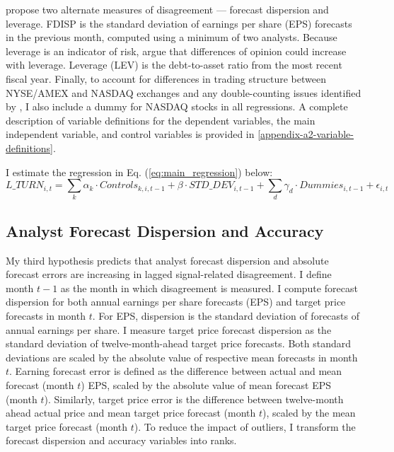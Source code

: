 \documentclass[
  12pt,
  a4paper,
  twoside,
  onecolumn]{article}
\begin{document}
 propose two alternate measures of
disagreement --- forecast dispersion and leverage. FDISP is the standard
deviation of earnings per share (EPS) forecasts in the previous month,
computed using a minimum of two analysts. Because leverage is an
indicator of risk,  argue that differences
of opinion could increase with leverage. Leverage (LEV) is the
debt-to-asset ratio from the most recent fiscal year. Finally, to
account for differences in trading structure between NYSE/AMEX and
NASDAQ exchanges and any double-counting issues identified by
\cite{nasdaq_double_counting}, I also include a dummy for NASDAQ stocks
in all regressions. A complete description of variable definitions for
the dependent variables, the main independent variable, and control
variables is provided in \ref{appendix-a2-variable-definitions}.

I estimate the regression in Eq. (\ref{eq:main_regression}) below:
\begin{equation}
\label{eq:main_regression}
L\_TURN_{i,t} = \sum_k \alpha_k \cdot Controls_{k,i,t-1} + \beta \cdot STD\_DEV_{i,t-1} + \sum_d \gamma_d \cdot Dummies_{i,t-1} + \epsilon_{i,t}
\end{equation}

\hypertarget{analyst-forecast-dispersion-and-accuracy}{%
\subsection{Analyst Forecast Dispersion and
Accuracy}\label{analyst-forecast-dispersion-and-accuracy}}

My third hypothesis predicts that analyst forecast dispersion and
absolute forecast errors are increasing in lagged signal-related
disagreement. I define month \(t-1\) as the month in which disagreement
is measured. I compute forecast dispersion for both annual earnings per
share forecasts (EPS) and target price forecasts in month \(t\). For
EPS, dispersion is the standard deviation of forecasts of annual
earnings per share. I measure target price forecast dispersion as the
standard deviation of twelve-month-ahead target price forecasts. Both
standard deviations are scaled by the absolute value of respective mean
forecasts in month \(t\). Earning forecast error is defined as the
difference between actual and mean forecast (month \(t\)) EPS, scaled by
the absolute value of mean forecast EPS (month \(t\)). Similarly, target
price error is the difference between twelve-month ahead actual price
and mean target price forecast (month \(t\)), scaled by the mean target
price forecast (month \(t\)). To reduce the impact of outliers, I
transform the forecast dispersion and accuracy variables into ranks.
\end{document}
